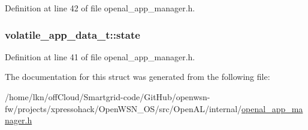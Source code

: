 Definition at line 42 of file openal\+\_\+app\+\_\+manager.\+h.

\subsubsection[{\texorpdfstring{state}{state}}]{ volatile\+\_\+app\+\_\+data\+\_\+t\+::state}\hypertarget{structvolatile__app__data__t_aa582a0d6fc824f28b008deca5a184bf7}{}\label{structvolatile__app__data__t_aa582a0d6fc824f28b008deca5a184bf7}


Definition at line 41 of file openal\+\_\+app\+\_\+manager.\+h.



The documentation for this struct was generated from the following file\+:\begin{DoxyCompactItemize}
\item 
/home/lkn/off\+Cloud/\+Smartgrid-\/code/\+Git\+Hub/openwsn-\/fw/projects/xpressohack/\+Open\+W\+S\+N\+\_\+\+O\+S/src/\+Open\+A\+L/internal/\hyperlink{openal__app__manager_8h}{openal\+\_\+app\+\_\+manager.\+h}\end{DoxyCompactItemize}

